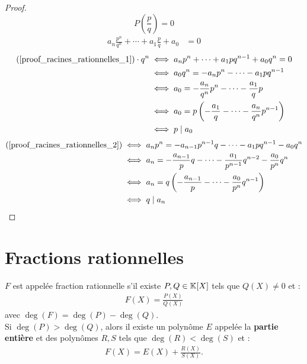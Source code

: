 \begin{proof}
	\[ P \left(\frac{p}{q}\right) = 0 \]
	\begin{align}\label{proof_racines_rationnelles_1}
		a_n \frac{p^n}{q^n} + \cdots + a_1 \frac{p}{q} + a_0 &= 0 
	\end{align}
	\begin{align}\label{proof_racines_rationnelles_2}
		(\ref{proof_racines_rationnelles_1}) \cdot q^n &\iff a_n p^n + \cdots + a_1 p q^{n-1} + a_0 q^n = 0 \\
	&\iff a_0 q^n = -a_n p^n - \cdots - a_1 p q^{n-1} \nonumber \\
	&\iff a_0 = -\frac{a_n}{q^n} p^n - \cdots - \frac{a_1}{q} p \nonumber \\
	&\iff a_0 = p \left( - \frac{a_1}{q} - \cdots - \frac{a_n}{q^n} p^{n-1} \right) \nonumber \\
	&\iff p \mid a_0 \nonumber
	\end{align}
	\begin{align*}
		(\ref{proof_racines_rationnelles_2}) &\iff a_n p^n = - a_{n-1} p^{n-1} q - \cdots - a_1 p q^{n-1} - a_0 q^n \\
		&\iff a_n = - \frac{a_{n-1}}{p} q - \cdots - \frac{a_1}{p^{n-1}} q^{n-2} - \frac{a_0}{p^n} q^n \\
		&\iff a_n = q \left( -\frac{a_{n-1}}{p} - \cdots - \frac{a_0}{p^n} q^{n-1} \right) \\
		&\iff q \mid a_n
	\end{align*}
\end{proof}

\section{Fractions rationnelles}
\begin{definition}
	$F$ est appelée fraction rationnelle s'il existe $P, Q \in \mathbb{K}[X]$ tels que $Q(X) \neq 0$ et :
	\begin{align*}
		F(X) = \frac{P(X)}{Q(X)}
	\end{align*}
	avec $\deg(F) = \deg(P) - \deg(Q)$. \\
	Si $\deg(P) > \deg(Q)$, alors il existe un polynôme $E$ appelée la \textbf{partie entière} et des polynômes $R, S$ tels que $\deg(R) < \deg(S)$ et : 
	\begin{align*}
		F(X) = E(X) + \frac{R(X)}{S(X)}.
	\end{align*}
\end{definition}

